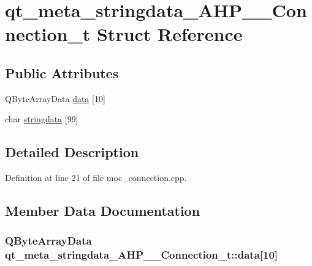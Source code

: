 \hypertarget{structqt__meta__stringdata___a_h_p_____connection__t}{}\section{qt\+\_\+meta\+\_\+stringdata\+\_\+\+A\+H\+P\+\_\+\+\_\+\+Connection\+\_\+t Struct Reference}
\label{structqt__meta__stringdata___a_h_p_____connection__t}
\subsection*{Public Attributes}
\begin{DoxyCompactItemize}
\item 
Q\+Byte\+Array\+Data \hyperlink{structqt__meta__stringdata___a_h_p_____connection__t_a587c1f4c2b269b2709f5926f2e48cf7c}{data} \mbox{[}10\mbox{]}
\item 
char \hyperlink{structqt__meta__stringdata___a_h_p_____connection__t_aca33441312edec146410217c76446058}{stringdata} \mbox{[}99\mbox{]}
\end{DoxyCompactItemize}


\subsection{Detailed Description}


Definition at line 21 of file moc\+\_\+connection.\+cpp.



\subsection{Member Data Documentation}
\hypertarget{structqt__meta__stringdata___a_h_p_____connection__t_a587c1f4c2b269b2709f5926f2e48cf7c}{}
\subsubsection[{data}]{\setlength{\rightskip}{0pt plus 5cm}Q\+Byte\+Array\+Data qt\+\_\+meta\+\_\+stringdata\+\_\+\+A\+H\+P\+\_\+\+\_\+\+Connection\+\_\+t\+::data\mbox{[}10\mbox{]}}\label{structqt__meta__stringdata___a_h_p_____connection__t_a587c1f4c2b269b2709f5926f2e48cf7c}


